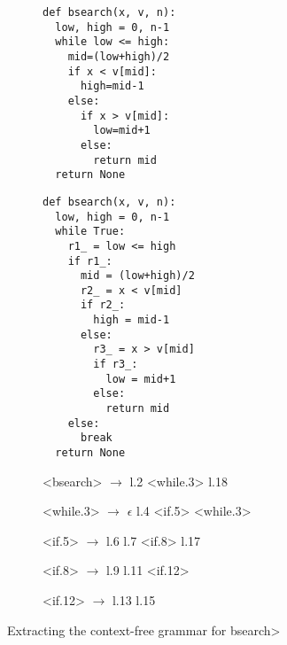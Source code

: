 \begin{figure*} %
  \centering
\begin{subfigure}[h]{0.30\textwidth} %
\begin{lstlisting}[style=Python, escapechar=|,numbersep=2pt]
def bsearch(x, v, n):
  low, high = 0, n-1
  while low <= high:
    mid=(low+high)/2
    if x < v[mid]:
      high=mid-1
    else:
      if x > v[mid]:
        low=mid+1
      else:
        return mid
  return None
\end{lstlisting}
\vspace{60pt}
\end{subfigure}
\begin{subfigure}[h]{0.30\textwidth} %
\begin{lstlisting}[style=Python, escapechar=|,numbersep=2pt]
def bsearch(x, v, n):
  low, high = 0, n-1
  while True:
    r1_ = low <= high
    if r1_:
      mid = (low+high)/2
      r2_ = x < v[mid]
      if r2_:
        high = mid-1
      else:
        r3_ = x > v[mid]
        if r3_:
          low = mid+1
        else:
          return mid
    else:
      break
  return None
\end{lstlisting}
\end{subfigure}
\begin{subfigure}[h]{0.30\textwidth}   %
\begin{grammar}%
  <bsearch> $\rightarrow$ l.2 <while.3> l.18

  <while.3> $\rightarrow$ $\epsilon$
   \alt l.4 <if.5> <while.3>

  <if.5>    $\rightarrow$ l.6 l.7 <if.8>
   \alt l.17

  <if.8> $\rightarrow$ l.9
   \alt l.11 <if.12>

  <if.12> $\rightarrow$ l.13
    \alt l.15
\end{grammar}
\end{subfigure}
\vspace{10pt}
\caption{Extracting the context-free grammar for \<bsearch>}
\label{fig:bsearch}
\end{figure*}
